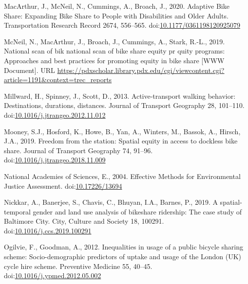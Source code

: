\documentclass[]{elsarticle} %
\begin{document}
\leavevmode\hypertarget{ref-macarthurAdaptiveBikeShare2020}{}%
MacArthur, J., McNeil, N., Cummings, A., Broach, J., 2020. Adaptive Bike
Share: Expanding Bike Share to People with Disabilities and Older
Adults. Transportation Research Record 2674, 556--565.
doi:\href{https://doi.org/10.1177/0361198120925079}{10.1177/0361198120925079}

\leavevmode\hypertarget{ref-trec2019}{}%
McNeil, N., MacArthur, J., Broach, J., Cummings, A., Stark, R.-L., 2019.
National scan of bik national scan of bike share equity pr quity
programs: Approaches and best practices for promoting equity in bike
share {[}WWW Document{]}. URL
\url{https://pdxscholar.library.pdx.edu/cgi/viewcontent.cgi?article=1191\&context=trec_reports}

\leavevmode\hypertarget{ref-millwardActivetransportWalkingBehavior2013}{}%
Millward, H., Spinney, J., Scott, D., 2013. Active-transport walking
behavior: Destinations, durations, distances. Journal of Transport
Geography 28, 101--110.
doi:\href{https://doi.org/10.1016/j.jtrangeo.2012.11.012}{10.1016/j.jtrangeo.2012.11.012}

\leavevmode\hypertarget{ref-mooneyFreedomStationSpatial2019}{}%
Mooney, S.J., Hosford, K., Howe, B., Yan, A., Winters, M., Bassok, A.,
Hirsch, J.A., 2019. Freedom from the station: Spatial equity in access
to dockless bike share. Journal of Transport Geography 74, 91--96.
doi:\href{https://doi.org/10.1016/j.jtrangeo.2018.11.009}{10.1016/j.jtrangeo.2018.11.009}

\leavevmode\hypertarget{ref-nationalacademiesofsciencesEffectiveMethodsEnvironmental2004}{}%
National Academies of Sciences, E., 2004. Effective Methods for
Environmental Justice Assessment.
doi:\href{https://doi.org/10.17226/13694}{10.17226/13694}

\leavevmode\hypertarget{ref-nickkarSpatialtemporalGenderLand2019}{}%
Nickkar, A., Banerjee, S., Chavis, C., Bhuyan, I.A., Barnes, P., 2019. A
spatial-temporal gender and land use analysis of bikeshare ridership:
The case study of Baltimore City. City, Culture and Society 18, 100291.
doi:\href{https://doi.org/10.1016/j.ccs.2019.100291}{10.1016/j.ccs.2019.100291}

\leavevmode\hypertarget{ref-ogilvieInequalitiesUsagePublic2012}{}%
Ogilvie, F., Goodman, A., 2012. Inequalities in usage of a public
bicycle sharing scheme: Socio-demographic predictors of uptake and usage
of the London (UK) cycle hire scheme. Preventive Medicine 55, 40--45.
doi:\href{https://doi.org/10.1016/j.ypmed.2012.05.002}{10.1016/j.ypmed.2012.05.002}
\end{document}
